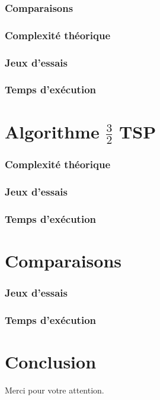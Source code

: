 \documentclass[french]{beamer}
\begin{document}
\begin{frame}
\frametitle{Comparaisons}
\end{frame}

\begin{frame}
\frametitle{Complexité théorique}
\end{frame}

\begin{frame}
\frametitle{Jeux d'essais}
\end{frame}

\begin{frame}
\frametitle{Temps d'exécution}
\end{frame}

\section{Algorithme $\frac{3}{2}$ TSP}

\begin{frame}
\frametitle{Complexité théorique}
\end{frame}

\begin{frame}
\frametitle{Jeux d'essais}
\end{frame}

\begin{frame}
\frametitle{Temps d'exécution}
\end{frame}

\section{Comparaisons}

\begin{frame}
\frametitle{Jeux d'essais}

\end{frame}

\begin{frame}
\frametitle{Temps d'exécution}
\end{frame}

\section{Conclusion}
\begin{frame}

\end{frame}


\begin{frame}
\begin{center}
Merci pour votre attention.
\end{center}
\end{frame}
\end{document}
